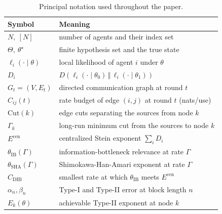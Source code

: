 \documentclass[journal]{IEEEtran}
\theoremstyle{definition}
\theoremstyle{remark}
\newcommand{\Ecen}{E^{\mathrm{cen}}}
\newcommand{\tib}{\theta_{\mathrm{IB}}}
\newcommand{\tsha}{\theta_{\mathrm{SHA}}}
\newcommand{\Gk}{\Gamma_k}
\newcommand{\Cdib}{C_{\mathrm{DIB}}}
\newcommand{\KL}[2]{D\!\left(#1\,\Vert\,#2\right)}
\begin{document}
\begin{table}[t]
\centering
\caption{Principal notation used throughout the paper.}
\label{tab:notation}
\renewcommand{\arraystretch}{1.25}
\begin{tabular}{@{}ll@{}}
\toprule
Symbol & Meaning \\
\midrule
$N,\ [N]$ & number of agents and their index set \\
$\Theta,\ \theta^\star$ & finite hypothesis set and the true state \\
$\ell_i(\cdot\mid\theta)$ & local likelihood of agent $i$ under $\theta$ \\
$D_i$ & $\KL{\ell_i(\cdot\mid\theta_0)}{\ell_i(\cdot\mid\theta_1)}$ \\
$G_t=(V,E_t)$ & directed communication graph at round $t$ \\
$C_{ij}(t)$ & rate budget of edge $(i,j)$ at round $t$ (nats/use) \\
$\mathrm{Cut}(k)$ & edge cuts separating the sources from node $k$ \\
$\Gk$ & long-run minimum cut from the sources to node $k$ \\
$\Ecen$ & centralized Stein exponent $\sum_i D_i$ \\
$\tib(\Gamma)$ & information-bottleneck relevance at rate $\Gamma$ \\
$\tsha(\Gamma)$ & Shimokawa-Han-Amari exponent at rate $\Gamma$ \\
$\Cdib$ & smallest rate at which $\tib$ meets $\Ecen$ \\
$\alpha_n,\beta_n$ & Type-I and Type-II error at block length $n$ \\
$E_k(\theta)$ & achievable Type-II exponent at node $k$ \\
\bottomrule
\end{tabular}
\end{table}
\end{document}
